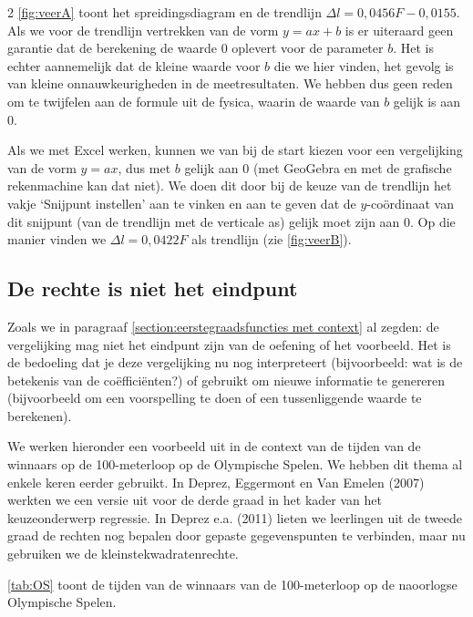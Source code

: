 \begin{multicols}{2}
\autoref{fig:veerA} toont het spreidingsdiagram en de trendlijn $\Delta l=0,0456F-0,0155$. Als we voor de trendlijn vertrekken van de vorm $y=ax+b$ is er uiteraard geen garantie dat de berekening de waarde $0$ oplevert voor de parameter $b$. Het is echter aannemelijk dat de kleine waarde voor $b$ die we hier vinden, het gevolg is van kleine onnauwkeurigheden in de meetresultaten. We hebben dus geen reden om te twijfelen aan de formule uit de fysica, waarin de waarde van $b$ gelijk is aan $0$.


Als we met Excel werken, kunnen we van bij de start kiezen voor een vergelijking van de vorm $y=ax$, dus met $b$ gelijk aan $0$ (met GeoGebra en met de grafische rekenmachine kan dat niet). We doen dit door bij de keuze van de trendlijn het vakje ‘Snijpunt instellen’ aan te vinken en aan te geven dat de $y$-coördinaat van dit snijpunt (van de trendlijn met de verticale as) gelijk moet zijn aan $0$. Op die manier vinden we $\Delta l=0,0422F$ als trendlijn (zie \autoref{fig:veerB}).


    \subsection{De rechte is niet het eindpunt}


Zoals we in paragraaf \ref{section:eerstegraadsfuncties met context} al zegden: de vergelijking mag niet het eindpunt zijn van de oefening of het voorbeeld. Het is de bedoeling dat je deze vergelijking nu nog interpreteert (bijvoorbeeld: wat is de betekenis van de coëfficiënten?) of gebruikt om nieuwe informatie te genereren (bijvoorbeeld om een voorspelling te doen of een tussenliggende waarde te berekenen).

We werken hieronder een voorbeeld uit in de context van de tijden van de winnaars op de 100-meterloop op de Olympische Spelen. We hebben dit thema al enkele keren eerder gebruikt. In Deprez, Eggermont en Van Emelen (2007) werkten we een versie uit voor de derde graad in het kader van het keuzeonderwerp regressie. In Deprez e.a. (2011) lieten we leerlingen uit de tweede graad de rechten nog bepalen door gepaste gegevenspunten te verbinden, maar nu gebruiken we de kleinstekwadratenrechte.

\autoref{tab:OS} toont de tijden van de winnaars van de 100-meterloop op de naoorlogse Olympische Spelen.

\end{multicols}


